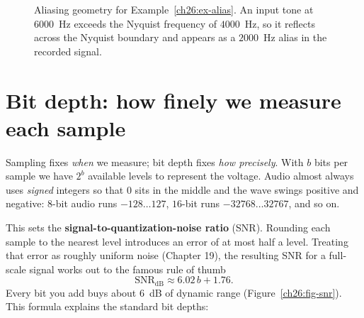 \begin{figure}[H]
\centering
{}
\caption{Aliasing geometry for Example~\ref{ch26:ex-alias}. An input tone at $6000$~Hz exceeds the Nyquist frequency of $4000$~Hz, so it reflects across the Nyquist boundary and appears as a $2000$~Hz alias in the recorded signal.}
\label{ch26:fig-alias}
\end{figure}


\section{Bit depth: how finely we measure each sample}
\label{ch26:bitdepth}

Sampling fixes \emph{when} we measure; bit depth fixes \emph{how precisely}. With $b$ bits per
sample we have $2^b$ available levels to represent the voltage. Audio almost always uses
\emph{signed} integers so that $0$ sits in the middle and the wave swings positive and negative:
$8$-bit audio runs $-128 \dots 127$, $16$-bit runs $-32768 \dots 32767$, and so on.

This sets the \textbf{signal-to-quantization-noise ratio} (SNR). Rounding each sample to
the nearest level introduces an error of at most half a level. Treating that error as roughly
uniform noise (Chapter 19), the resulting SNR for a full-scale signal works out to the famous
rule of thumb
\[
  \mathrm{SNR}_{\text{dB}} \approx 6.02\,b + 1.76.
\]
Every bit you add buys about $6$~dB of dynamic range (Figure~\ref{ch26:fig-snr}). This formula
explains the standard bit depths:

